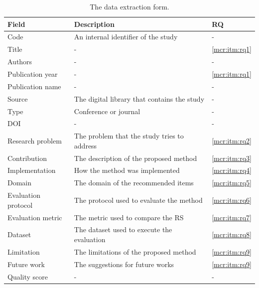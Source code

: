\begin{table}
\centering
\begin{tabular}{@{}lll@{}}
\toprule
Field & Description & RQ  \\ \midrule
Code & An internal identifier of the study & - \\
Title & - & \ref{mcr:itm:rq1} \\
Authors & - & - \\
Publication year & - & \ref{mcr:itm:rq1} \\
Publication name & - & - \\
Source & The digital library that contains the study & - \\
Type & Conference or journal & - \\
DOI & - & - \\
Research problem & The problem that the study tries to address & \ref{mcr:itm:rq2} \\
Contribution & The description of the proposed method & \ref{mcr:itm:rq3} \\
Implementation & How the method was implemented & \ref{mcr:itm:rq4} \\
Domain & The domain of the recommended items & \ref{mcr:itm:rq5} \\
Evaluation protocol & The protocol used to evaluate the method & \ref{mcr:itm:rq6} \\
Evaluation metric & The metric used to compare the RS & \ref{mcr:itm:rq7} \\
Dataset & The dataset used to execute the evaluation & \ref{mcr:itm:rq8} \\
Limitation & The limitations of the proposed method & \ref{mcr:itm:rq9} \\
Future work & The suggestions for future works & \ref{mcr:itm:rq9} \\
Quality score & - & - \\ \bottomrule
\end{tabular}
\caption[Data extraction form]{The data extraction form.}
\label{mcr:tab:form}
\end{table}

